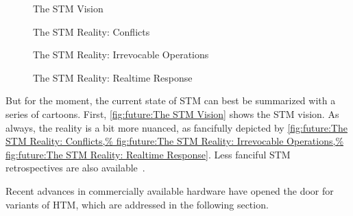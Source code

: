 \begin{figure}[tb]
\centering
{}
\caption{The STM Vision}
\end{figure}

\begin{figure}[tb]
\centering
{}
\caption{The STM Reality: Conflicts}
\end{figure}

\begin{figure}[tb]
\centering
{}
\caption{The STM Reality: Irrevocable Operations}
\end{figure}

\begin{figure}[tb]
\centering
{}
\caption{The STM Reality: Realtime Response}
\end{figure}

But for the moment, the current state of STM
can best be summarized with a series of cartoons.
First,
\cref{fig:future:The STM Vision}
shows the STM vision.
As always, the reality is a bit more nuanced, as fancifully depicted by
\cref{fig:future:The STM Reality: Conflicts,%
fig:future:The STM Reality: Irrevocable Operations,%
fig:future:The STM Reality: Realtime Response}.
Less fanciful STM retrospectives are also
available~\cite{JoeDuffy2010RetroTM,JoeDuffy2010RetroTM2}.

Recent advances in commercially available hardware have opened the door
for variants of HTM, which are addressed in the following section.
